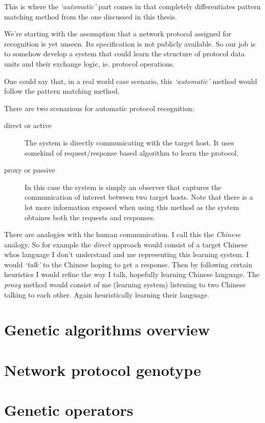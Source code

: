\documentclass[times, utf8, diplomski]{fer}
\begin{document}
This is where the \emph{`automatic'} part comes in that completely differentiates
pattern matching method from the one discussed in this thesis.

We're starting with the assumption that a network protocol assigned for recognition
is yet unseen. Its specification is not publicly available. So our job is to somehow 
develop a system that could learn the structure of protocol data units and their 
exchange logic, ie. protocol operations.

One could say that, in a real world case scenario, this \emph{`automatic'} method 
would follow the pattern matching method.

There are two scenarious for automatic protocol recognition:
\begin{description}
	\item[direct or active] The system is directly communicating with the target 
		host. It uses somekind of request/response based algorithm to learn the 
		protocol.
	\item[proxy or passive] In this case the system is simply an observer that
		captures the communication of interest between two target hosts. Note that
		there is a lot more information exposed when using this method as the system
		obtaines both the requests and responses.
\end{description}

There are analogies with the human communication. I call this the \emph{Chinese} 
analogy. So for example the \emph{direct} approach would consist of a target Chinese
whos language I don't understand and me representing this learning system. I would
\emph{`talk'} to the Chinese hoping to get a response. Then by following certain
heuristics I would refine the way I talk, hopefully learning Chinese language.
The \emph{proxy} method would consist of me (learning system) listening to two
Chinese talking to each other. Again heuristically learning their language.



\section{Genetic algorithms overview}
\section{Network protocol genotype}
\section{Genetic operators}
\end{document}
